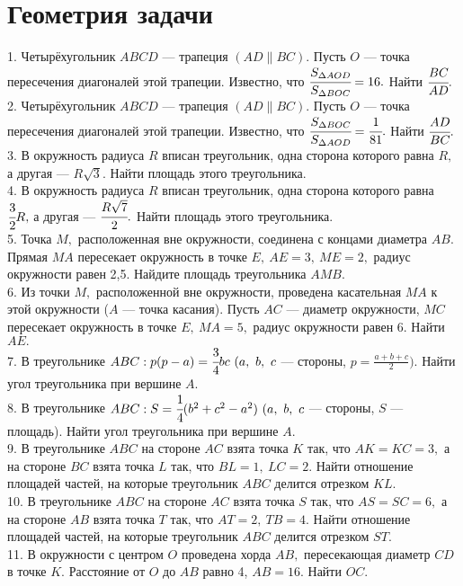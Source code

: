 \section{Геометрия задачи}
1. Четырёхугольник $ABCD$ --- трапеция $(AD\parallel BC).$ Пусть $O$ --- точка пересечения диагоналей этой трапеции. Известно, что $\cfrac{S_{\Delta AOD}}{S_{\Delta BOC}}=16.$ Найти $\cfrac{BC}{AD}.$\\
2. Четырёхугольник $ABCD$ --- трапеция $(AD\parallel BC).$ Пусть $O$ --- точка пересечения диагоналей этой трапеции. Известно, что $\cfrac{S_{\Delta BOC}}{S_{\Delta AOD}}=\cfrac{1}{81}.$ Найти $\cfrac{AD}{BC}.$\\
3. В окружность радиуса $R$ вписан треугольник, одна сторона которого равна $R,$ а другая --- $R\sqrt{3}.$ Найти площадь этого треугольника.\\
4. В окружность радиуса $R$ вписан треугольник, одна сторона которого равна $\cfrac{3}{2}R,$ а другая --- $\cfrac{R\sqrt{7}}{2}.$ Найти площадь этого треугольника.\\
5. Точка $M,$ расположенная вне окружности, соединена с концами диаметра $AB.$ Прямая $MA$ пересекает окружность в точке $E,\ AE=3,\ ME=2,$ радиус окружности равен 2,5. Найдите площадь треугольника $AMB.$\\
6. Из точки $M,$ расположенной вне окружности, проведена касательная $MA$ к этой окружности ($A$ --- точка касания). Пусть $AC$ --- диаметр окружности, $MC$ пересекает окружность в точке $E,\ MA=5,$ радиус окружности равен 6. Найти $AE.$\\
7. В треугольнике $ABC: p(p-a)=\cfrac{3}{4}bc\ (a,\ b,\ c$ --- стороны, $p=\frac{a+b+c}{2}).$ Найти угол треугольника при вершине $A.$\\
8. В треугольнике $ABC: S=\cfrac{1}{4}(b^2+c^2-a^2)\ (a,\ b,\ c$ --- стороны, $S$ --- площадь). Найти угол треугольника при вершине $A.$\\
9. В треугольнике $ABC$ на стороне $AC$ взята точка $K$ так, что $AK=KC=3,$ а на стороне $BC$ взята точка $L$ так, что $BL=1,\ LC=2.$ Найти отношение площадей частей, на которые треугольник $ABC$ делится отрезком $KL.$\\
10. В треугольнике $ABC$ на стороне $AC$ взята точка $S$ так, что $AS=SC=6,$ а на стороне $AB$ взята точка $T$ так, что $AT=2,\ TB=4.$ Найти отношение площадей частей, на которые треугольник $ABC$ делится отрезком $ST.$\\
11. В окружности с центром $O$ проведена хорда $AB,$ пересекающая диаметр $CD$ в точке $K.$ Расстояние от  $O$ до $AB$ равно 4, $AB=16.$ Найти $OC.$\\

